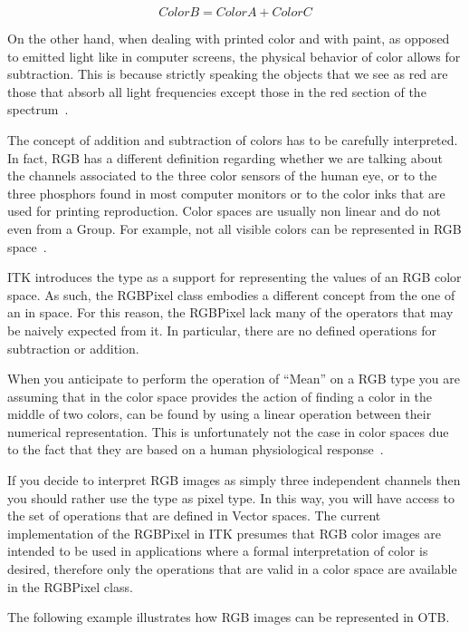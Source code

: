 \begin{equation}
\label{eqn:ColorAddition}
         ColorB = ColorA + ColorC
\end{equation}

On the other hand, when dealing with printed color and with paint, as opposed
to emitted light like in computer screens, the physical behavior of color
allows for subtraction. This is because strictly speaking the objects that we
see as red are those that absorb all light frequencies except those in the red
section of the spectrum~\cite{Wyszecki2000}.

The concept of addition and subtraction of colors has to be carefully
interpreted. In fact, RGB has a different definition regarding whether we are
talking about the channels associated to the three color sensors of the human
eye, or to the three phosphors found in most computer monitors or to the color
inks that are used for printing reproduction.  Color spaces are usually non
linear and do not even from a Group. For example, not all visible colors can be
represented in RGB space~\cite{Wyszecki2000}.

ITK introduces the  type as a support for representing the
values of an RGB color space. As such, the RGBPixel class embodies a different
concept from the one of an  in space. For this reason, the
RGBPixel lack many of the operators that may be naively expected from it. In
particular, there are no defined operations for subtraction or addition.

When you anticipate to perform the operation of ``Mean'' on a RGB type you are
assuming that in the color space provides the action of finding a color in the
middle of two colors, can be found by using a linear operation between their
numerical representation. This is unfortunately not the case in  color spaces
due to the fact that they are based on a human physiological
response~\cite{Malacara2002}.

If you decide to interpret RGB images as simply three independent channels then
you should rather use the  type as pixel type. In this way, you
will have access to the set of operations that are defined in Vector spaces.
The current implementation of the RGBPixel in ITK presumes that RGB color
images are intended to be used in applications where a formal interpretation of
color is desired, therefore only the operations that are valid in a color space
are available in the RGBPixel class.

The following example illustrates how RGB images can be represented in OTB.


